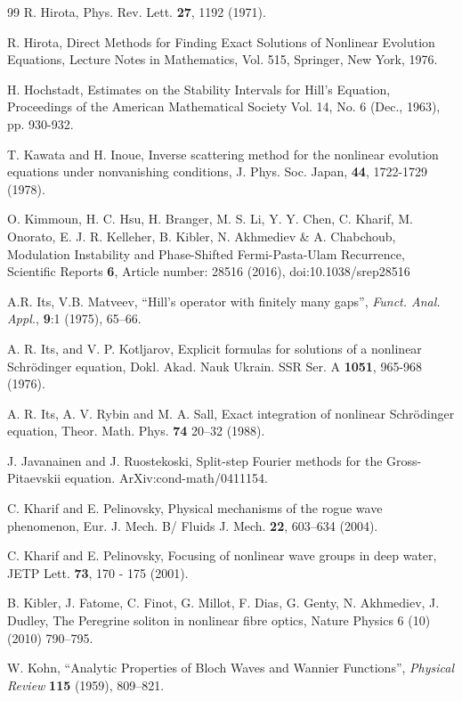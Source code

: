 \documentclass[12pt]{article}
\begin{document}
\begin{thebibliography}{99}
 R. Hirota, Phys. Rev. Lett. {\bf 27}, 1192 (1971).

 R. Hirota, Direct Methods for Finding Exact Solutions of Nonlinear Evolution Equations, Lecture Notes in Mathematics, Vol. 515, Springer, New York, 1976.

 H. Hochstadt, Estimates on the Stability Intervals for Hill's Equation, Proceedings of the American Mathematical Society Vol. 14, No. 6 (Dec., 1963), pp. 930-932.

 T. Kawata and H. Inoue, Inverse scattering method for the nonlinear evolution equations under nonvanishing conditions, J. Phys. Soc. Japan, {\bf 44}, 1722-1729 (1978).

 O. Kimmoun, H. C. Hsu, H. Branger, M. S. Li, Y. Y. Chen, C. Kharif, M. Onorato, E. J. R. Kelleher, B. Kibler, N. Akhmediev \& A. Chabchoub, Modulation Instability and Phase-Shifted Fermi-Pasta-Ulam Recurrence, 
Scientific Reports {\bf 6}, Article number: 28516 (2016), doi:10.1038/srep28516
  
 A.R. Its, V.B. Matveev, ``Hill's operator with finitely many gaps'', \textit{Funct. Anal. Appl.}, \textbf{9}:1 (1975), 65--66.

 A. R. Its, and V. P. Kotljarov, Explicit formulas for solutions of a nonlinear Schr\"odinger equation, Dokl. Akad. Nauk Ukrain. SSR Ser. A {\bf 1051}, 965-968 (1976).

 A. R. Its, A. V. Rybin and M. A. Sall, Exact integration of nonlinear Schr\"odinger equation, Theor. Math. Phys. {\bf 74} 20--32 (1988).

 J. Javanainen and J. Ruostekoski, Split-step Fourier methods for the Gross-Pitaevskii equation. ArXiv:cond-math/0411154.

 C. Kharif and E. Pelinovsky, Physical mechanisms of the rogue wave phenomenon, Eur. J. Mech. B/ Fluids J. Mech. {\bf 22}, 603--634 (2004).

 C. Kharif and E. Pelinovsky, Focusing of nonlinear wave groups in deep water, JETP Lett. {\bf 73}, 170 - 175 (2001). 

 B. Kibler, J. Fatome, C. Finot, G. Millot, F. Dias, G. Genty, N. Akhmediev, J. Dudley, The Peregrine soliton in nonlinear fibre optics, Nature Physics 6 (10) (2010) 790--795.

 W. Kohn, ``Analytic Properties of Bloch Waves and Wannier Functions'', \textit{Physical Review} \textbf{115} (1959), 809--821.


\end{thebibliography}
\end{document}
